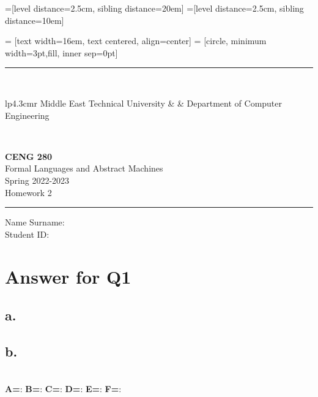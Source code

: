 \documentclass[12pt]{article}
\newcommand{\HRule}{\rule{\linewidth}{1mm}}
\begin{document}
=[level distance=2.5cm, sibling distance=20em]
=[level distance=2.5cm, sibling distance=10em]

 = [text width=16em, text centered, align=center]
 = [circle, minimum width=3pt,fill, inner sep=0pt]

\noindent
\HRule \\[3mm]
\small
\begin{tabular}[b]{lp{4.3cm}r}
Middle East Technical University &  &
Department of Computer Engineering \\
\end{tabular} \\
\begin{center}

                 \LARGE \textbf{CENG 280} \\[4mm]
                 \Large Formal Languages and Abstract Machines \\[4mm]
                \normalsize Spring 2022-2023 \\
                    \Large Homework 2 \\
\end{center}
\HRule



\begin{center}
Name Surname:   \\
Student ID: 
\end{center}



\section*{Answer for Q1}

\subsection*{a.} 
 
\subsection*{b.}    \hfill\\
\textbf{A=}:        \newline
\textbf{B=}:        \newline
\textbf{C=}:        \newline
\textbf{D=}:        \newline
\textbf{E=}:        \newline
\textbf{F=}:        
\end{document}
